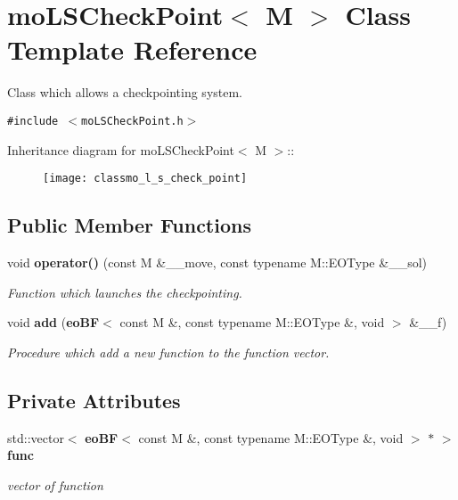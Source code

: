\section{moLSCheckPoint$<$ M $>$ Class Template Reference}
\label{classmo_l_s_check_point}
Class which allows a checkpointing system.  


{\tt \#include $<$moLSCheckPoint.h$>$}

Inheritance diagram for moLSCheckPoint$<$ M $>$::\begin{figure}[H]
\begin{center}
\leavevmode
\texttt{[image: classmo\_l\_s\_check\_point]}
\end{center}
\end{figure}
\subsection*{Public Member Functions}
\begin{CompactItemize}
\item 
void {\bf operator()} (const M \&\_\-\_\-move, const typename M::EOType \&\_\-\_\-sol)
\begin{CompactList}\small\item\em Function which launches the checkpointing. \item\end{CompactList}\item 
void {\bf add} ({\bf eoBF}$<$ const M \&, const typename M::EOType \&, void $>$ \&\_\-\_\-f)
\begin{CompactList}\small\item\em Procedure which add a new function to the function vector. \item\end{CompactList}\end{CompactItemize}
\subsection*{Private Attributes}
\begin{CompactItemize}
\item 
std::vector$<$ {\bf eoBF}$<$ const M \&, const typename M::EOType \&, void $>$ $\ast$ $>$ {\bf func}\label{classmo_l_s_check_point_ff2a31ee5689a804bd9a572c51a36ca4}

\begin{CompactList}\small\item\em vector of function \item\end{CompactList}\end{CompactItemize}


